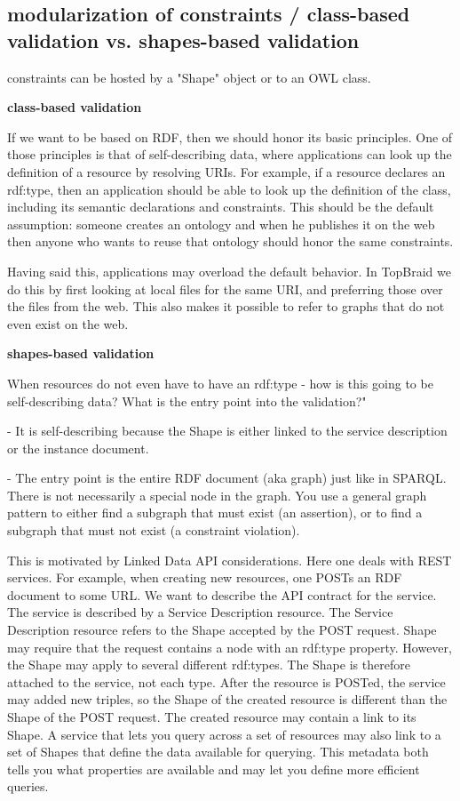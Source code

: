 \documentclass{llncs}
\newcommand{\tb}[1]{\todo[size=\small, color=green!40]{\textbf{Thomas:} #1}}
\begin{document}
\tb{how is it done using our approach}

\subsection{modularization of constraints / class-based validation vs. shapes-based validation}

constraints can be hosted by a "Shape" object or to an OWL class. 

\textbf{class-based validation}

If we want to be based on RDF, then we should honor its basic principles. One of those principles is that of self-describing data, where applications can look up the definition of a resource by resolving URIs. For example, if a resource declares an rdf:type, then an application should be able to look up the definition of the class, including its semantic declarations and constraints. This should be the default assumption: someone creates an ontology and when he publishes it on the web then anyone who wants to reuse that ontology should honor the same constraints.

Having said this, applications may overload the default behavior. In TopBraid we do this by first looking at local files for the same URI, and preferring those over the files from the web. This also makes it possible to refer to graphs that do not even exist on the web.

\textbf{shapes-based validation}

When resources do not even have to have an rdf:type - how is this going to be
self-describing data? What is the entry point into the validation?"

- It is self-describing because the Shape is either linked to the service
description or the instance document.

- The entry point is the entire RDF document (aka graph) just like in
SPARQL.  There is not necessarily a special node in the graph. You use a
general graph pattern to either find a subgraph that must exist (an
assertion), or to find a subgraph that must not exist (a constraint
violation).

This is motivated by Linked Data API considerations. Here
one deals with REST services. For example, when creating new resources,
one POSTs an RDF document to some URL. We want to describe the API
contract for the service. The service is described by a Service
Description resource. The Service Description resource refers to the Shape
accepted by the POST request. Shape may require that the request contains
a node with an rdf:type property. However, the Shape may apply to several
different rdf:types. The Shape is therefore attached to the service, not
each type. After the resource is POSTed, the service may added new
triples, so the Shape of the created resource is different than the Shape
of the POST request. The created resource may contain a link to its Shape.
A service that lets you query across a set of resources may also link to a
set of Shapes that define the data available for querying. This metadata
both tells you what properties are available and may let you define more
efficient queries.
\end{document}
